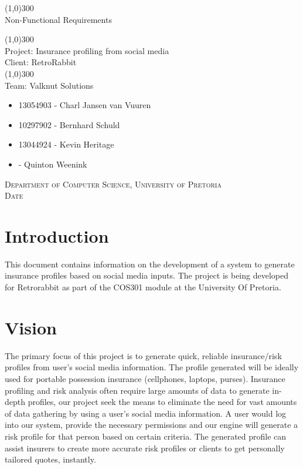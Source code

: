 \documentclass{article}
\begin{document}
	\begin{titlepage}
		\begin{center}
		
			\line(1,0){300}\\
			[6mm]
			\huge{
			Non-Functional Requirements\\
			}
			
			\line(1,0){300}\\
			\huge{Project: Insurance profiling from social media\\
			Client: RetroRabbit} \\
			\line(1,0){300}\\
			\huge{Team: Valknut Solutions}
			
			\large
			{
			\begin{itemize}
			
				\item 13054903 - Charl Jansen van Vuuren 
				\item 10297902 - Bernhard Schuld      
				\item 13044924 - Kevin Heritage
				\item 	- Quinton Weenink
			\end{itemize}
			}
		\textsc{\large  Department of Computer Science, University of Pretoria}\\
		[0.5cm]
		\textsc{\large Date}	
		\end{center}

			
	\end{titlepage}
	\cleardoublepage
	\tableofcontents
	\cleardoublepage
\section{Introduction}
This document contains information on the development of a system to generate insurance profiles based on social media inputs. The project is being developed for Retrorabbit as part of the COS301 module at the University Of Pretoria.
\section{Vision}
The primary focus of this project is to generate quick, reliable insurance/risk profiles from user's social media information. The profile generated will be ideally used for portable possession insurance (cellphones, laptops, purses). Insurance profiling and risk analysis often require large amounts of data to generate in-depth profiles, our project seek the means to eliminate the need for vast amounts of data gathering by using a user's social media information. A user would log into our system, provide the necessary permissions and our engine will generate a risk profile for that person based on certain criteria. The generated profile can assist insurers to create more accurate risk profiles or clients to get personally tailored quotes, instantly.
\end{document}
